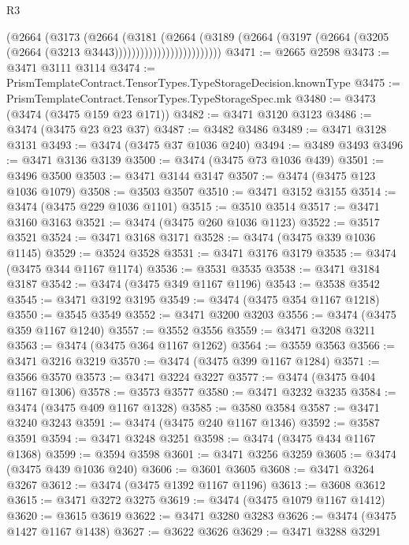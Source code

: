 \begin{lexlean}{R3}
\begin{coremodule}
                              (@2664
                                (@3173
                                  (@2664
                                    (@3181
                                      (@2664
                                        (@3189
                                          (@2664
                                            (@3197
                                              (@2664
                                                (@3205 (@2664 (@3213 @3443)))))))))))))))))))))))))
@3471 := @2665 @2598
@3473 := @3471 @3111 @3114
@3474 := PrismTemplateContract.TensorTypes.TypeStorageDecision.knownType
@3475 := PrismTemplateContract.TensorTypes.TypeStorageSpec.mk
@3480 := @3473 (@3474 (@3475 @159 @23 @171))
@3482 := @3471 @3120 @3123
@3486 := @3474 (@3475 @23 @23 @37)
@3487 := @3482 @3486
@3489 := @3471 @3128 @3131
@3493 := @3474 (@3475 @37 @1036 @240)
@3494 := @3489 @3493
@3496 := @3471 @3136 @3139
@3500 := @3474 (@3475 @73 @1036 @439)
@3501 := @3496 @3500
@3503 := @3471 @3144 @3147
@3507 := @3474 (@3475 @123 @1036 @1079)
@3508 := @3503 @3507
@3510 := @3471 @3152 @3155
@3514 := @3474 (@3475 @229 @1036 @1101)
@3515 := @3510 @3514
@3517 := @3471 @3160 @3163
@3521 := @3474 (@3475 @260 @1036 @1123)
@3522 := @3517 @3521
@3524 := @3471 @3168 @3171
@3528 := @3474 (@3475 @339 @1036 @1145)
@3529 := @3524 @3528
@3531 := @3471 @3176 @3179
@3535 := @3474 (@3475 @344 @1167 @1174)
@3536 := @3531 @3535
@3538 := @3471 @3184 @3187
@3542 := @3474 (@3475 @349 @1167 @1196)
@3543 := @3538 @3542
@3545 := @3471 @3192 @3195
@3549 := @3474 (@3475 @354 @1167 @1218)
@3550 := @3545 @3549
@3552 := @3471 @3200 @3203
@3556 := @3474 (@3475 @359 @1167 @1240)
@3557 := @3552 @3556
@3559 := @3471 @3208 @3211
@3563 := @3474 (@3475 @364 @1167 @1262)
@3564 := @3559 @3563
@3566 := @3471 @3216 @3219
@3570 := @3474 (@3475 @399 @1167 @1284)
@3571 := @3566 @3570
@3573 := @3471 @3224 @3227
@3577 := @3474 (@3475 @404 @1167 @1306)
@3578 := @3573 @3577
@3580 := @3471 @3232 @3235
@3584 := @3474 (@3475 @409 @1167 @1328)
@3585 := @3580 @3584
@3587 := @3471 @3240 @3243
@3591 := @3474 (@3475 @240 @1167 @1346)
@3592 := @3587 @3591
@3594 := @3471 @3248 @3251
@3598 := @3474 (@3475 @434 @1167 @1368)
@3599 := @3594 @3598
@3601 := @3471 @3256 @3259
@3605 := @3474 (@3475 @439 @1036 @240)
@3606 := @3601 @3605
@3608 := @3471 @3264 @3267
@3612 := @3474 (@3475 @1392 @1167 @1196)
@3613 := @3608 @3612
@3615 := @3471 @3272 @3275
@3619 := @3474 (@3475 @1079 @1167 @1412)
@3620 := @3615 @3619
@3622 := @3471 @3280 @3283
@3626 := @3474 (@3475 @1427 @1167 @1438)
@3627 := @3622 @3626
@3629 := @3471 @3288 @3291

\end{coremodule}
\end{lexlean}
